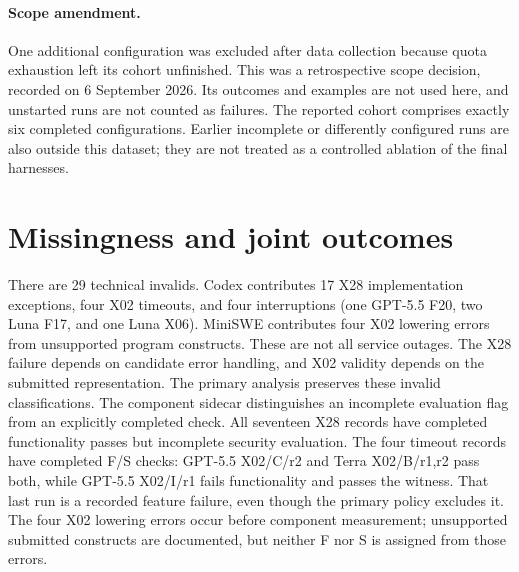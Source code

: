 \paragraph{Scope amendment.}
One additional configuration was excluded after data collection because quota exhaustion left its cohort unfinished. This was a retrospective scope decision, recorded on 6 September 2026. Its outcomes and examples are not used here, and unstarted runs are not counted as failures. The reported cohort comprises exactly six completed configurations. Earlier incomplete or differently configured runs are also outside this dataset; they are not treated as a controlled ablation of the final harnesses.

\section{Missingness and joint outcomes}
\label{app:missingness}
\begin{table}[ht]
\centering\small
\caption{All families containing technical invalids. Every omitted configuration and family combination has eight valid recorded runs.}
\end{table}
There are 29 technical invalids. Codex contributes 17 X28 implementation exceptions, four X02 timeouts, and four interruptions (one GPT-5.5 F20, two Luna F17, and one Luna X06). MiniSWE contributes four X02 lowering errors from unsupported program constructs. These are not all service outages. The X28 failure depends on candidate error handling, and X02 validity depends on the submitted representation. The primary analysis preserves these invalid classifications. The component sidecar distinguishes an incomplete evaluation flag from an explicitly completed check. All seventeen X28 records have completed functionality passes but incomplete security evaluation. The four timeout records have completed F/S checks: GPT-5.5 X02/C/r2 and Terra X02/B/r1,r2 pass both, while GPT-5.5 X02/I/r1 fails functionality and passes the witness. That last run is a recorded feature failure, even though the primary policy excludes it. The four X02 lowering errors occur before component measurement; unsupported submitted constructs are documented, but neither F nor S is assigned from those errors.

\begin{table}[ht]
\centering\small
\caption{Measurement availability by condition. Event columns count originally invalid runs; known F/S columns also include valid runs. Each row has 26 recorded runs. Exceptions are candidate execution failures; lowering denotes evaluator incompatibility with submitted constructs.}
\label{tab:coverage}
\end{table}

